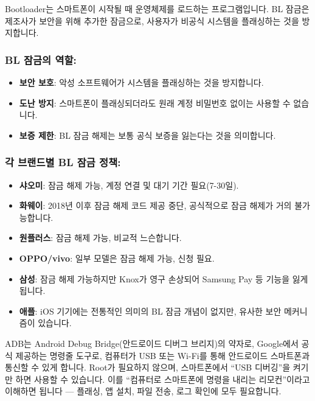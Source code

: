 
Bootloader는 스마트폰이 시작될 때 운영체제를 로드하는 프로그램입니다. BL 잠금은 제조사가 보안을 위해 추가한 잠금으로, 사용자가 비공식 시스템을 플래싱하는 것을 방지합니다.

\subsubsection*{BL 잠금의 역할:}

\begin{itemize}
  \item \textbf{보안 보호}: 악성 소프트웨어가 시스템을 플래싱하는 것을 방지합니다.
  \item \textbf{도난 방지}: 스마트폰이 플래싱되더라도 원래 계정 비밀번호 없이는 사용할 수 없습니다.
  \item \textbf{보증 제한}: BL 잠금 해제는 보통 공식 보증을 잃는다는 것을 의미합니다.
\end{itemize}

\subsubsection*{각 브랜드별 BL 잠금 정책:}

\begin{itemize}
  \item \textbf{샤오미}: 잠금 해제 가능, 계정 연결 및 대기 기간 필요(7-30일).
  \item \textbf{화웨이}: 2018년 이후 잠금 해제 코드 제공 중단, 공식적으로 잠금 해제가 거의 불가능합니다.
  \item \textbf{원플러스}: 잠금 해제 가능, 비교적 느슨합니다.
  \item \textbf{OPPO/vivo}: 일부 모델은 잠금 해제 가능, 신청 필요.
  \item \textbf{삼성}: 잠금 해제 가능하지만 Knox가 영구 손상되어 Samsung Pay 등 기능을 잃게 됩니다.
  \item \textbf{애플}: iOS 기기에는 전통적인 의미의 BL 잠금 개념이 없지만, 유사한 보안 메커니즘이 있습니다.
\end{itemize}


ADB는 Android Debug Bridge(안드로이드 디버그 브리지)의 약자로, Google에서 공식 제공하는 명령줄 도구로, 컴퓨터가 USB 또는 Wi-Fi를 통해 안드로이드 스마트폰과 통신할 수 있게 합니다. Root가 필요하지 않으며, 스마트폰에서 “USB 디버깅”을 켜기만 하면 사용할 수 있습니다. 이를 “컴퓨터로 스마트폰에 명령을 내리는 리모컨”이라고 이해하면 됩니다 — 플래싱, 앱 설치, 파일 전송, 로그 확인에 모두 필요합니다.

